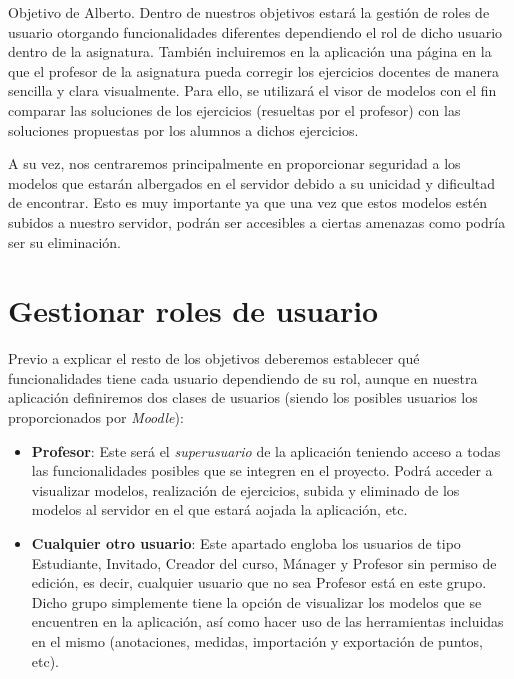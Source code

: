 
Objetivo de Alberto.
Dentro de nuestros objetivos estará la gestión de roles de usuario otorgando funcionalidades diferentes dependiendo el rol de dicho usuario dentro de la asignatura. También incluiremos en la aplicación una página en la que el profesor de la asignatura pueda corregir los ejercicios docentes de manera sencilla y clara visualmente. Para ello, se utilizará el visor de modelos con el fin comparar las soluciones de los ejercicios (resueltas por el profesor) con las soluciones propuestas por los alumnos a dichos ejercicios.

A su vez, nos centraremos principalmente en proporcionar seguridad a los modelos que estarán albergados en el servidor debido a su unicidad y dificultad de encontrar. Esto es muy importante ya que una vez que estos modelos estén subidos a nuestro servidor, podrán ser accesibles a ciertas amenazas como podría ser su eliminación.

\section{Gestionar roles de usuario}
Previo a explicar el resto de los objetivos deberemos establecer qué funcionalidades tiene cada usuario dependiendo de su rol, aunque en nuestra aplicación definiremos dos clases de usuarios (siendo los posibles usuarios los proporcionados por \textit{Moodle}):

\begin{itemize}
	\item \textbf{Profesor}: Este será el \textit{superusuario} de la aplicación teniendo acceso a todas las funcionalidades posibles que se integren en el proyecto. Podrá acceder a visualizar modelos, realización de ejercicios, subida y eliminado de los modelos al servidor en el que estará aojada la aplicación, etc.
	
	\item \textbf{Cualquier otro usuario}: Este apartado engloba los usuarios de tipo Estudiante, Invitado, Creador del curso, Mánager y Profesor sin permiso de edición, es decir, cualquier usuario que no sea Profesor está en este grupo. Dicho grupo simplemente tiene la opción de visualizar los modelos que se encuentren en la aplicación, así como hacer uso de las herramientas incluidas en el mismo (anotaciones, medidas, importación y exportación de puntos, etc).
\end{itemize}

